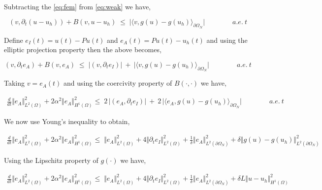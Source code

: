 \documentclass[10pt]{report}
\numberwithin{equation}{section}
\begin{document}
Subtracting the \eqref{eq:fem} from \eqref{eq:weak} we have,

\begin{equation}
(v,\partial_{t} (u - u_{h})) + B(v,u-u_{h}) \; \leq \; \vert \langle v, g(u) -g(u_{h}) \rangle_{\partial \Omega_{N}} \vert \qquad \qquad a.e. \ t
\end{equation} 



Define $e_{I}(t) = u(t) - Pu(t)$ and $e_{A}(t) = Pu(t) - u_{h}(t)$ and using the elliptic projection property then the above becomes,

\begin{equation}
(v,\partial_{t} e_{A}) + B(v, e_{A}) \; \leq \; \vert (v,\partial_{t} e_{I}) \vert \ + \ \vert \langle v, g(u) -g(u_{h}) \rangle_{\partial \Omega_{N}} \vert \qquad \qquad a.e. \ t
\end{equation} 


Taking $v = e_{A}(t)$ and using the coercivity property of $B(\cdot, \cdot)$ we have,

\begin{align}
\frac{d}{dt} \Vert e_{A} \Vert^{2}_{L^{2}(\Omega)}  +  2\alpha^{2} \Vert e_{A} \Vert_{H^{1}(\Omega)}^{2}  \leq \;  2 \, \vert (e_{A},\partial_{t} e_{I}) \vert \ + \ 2 \, \vert \langle e_{A}, g(u) -g(u_{h}) \rangle_{\partial \Omega_{N}} \vert \qquad \qquad a.e. \ t
\end{align} 


We now use Young's inequality to obtain,

\begin{align}
\frac{d}{dt} \Vert e_{A} \Vert^{2}_{L^{2}(\Omega)}  +  2\alpha^{2} \Vert e_{A} \Vert_{H^{1}(\Omega)}^{2}  \leq \; \Vert  e_{A} \Vert_{L^{2}(\Omega)}^{2} + 4 \Vert \partial_{t} e_{I} \Vert^{2}_{L^{2}(\Omega)} + \frac{1}{\delta} \Vert  e_{A} \Vert_{L^{2}(\partial \Omega_{N})}^{2} + \delta \Vert g(u) -g(u_{h}) \Vert_{L^{2}(\partial \Omega_{N})}^{2}
\end{align} 



Using the Lipschitz property of $g(\cdot)$ we have,

\begin{align}
\frac{d}{dt} \Vert e_{A} \Vert^{2}_{L^{2}(\Omega)}  +  2\alpha^{2} \Vert e_{A} \Vert_{H^{1}(\Omega)}^{2}  \leq \; \Vert  e_{A} \Vert_{L^{2}(\Omega)}^{2} + 4 \Vert \partial_{t} e_{I} \Vert^{2}_{L^{2}(\Omega)} + \frac{1}{\delta} \Vert  e_{A} \Vert_{L^{2}(\partial \Omega_{N})}^{2} + \delta L \Vert u -u_{h} \Vert_{H^{1}(\Omega)}^{2}
\end{align} 
\end{document}
